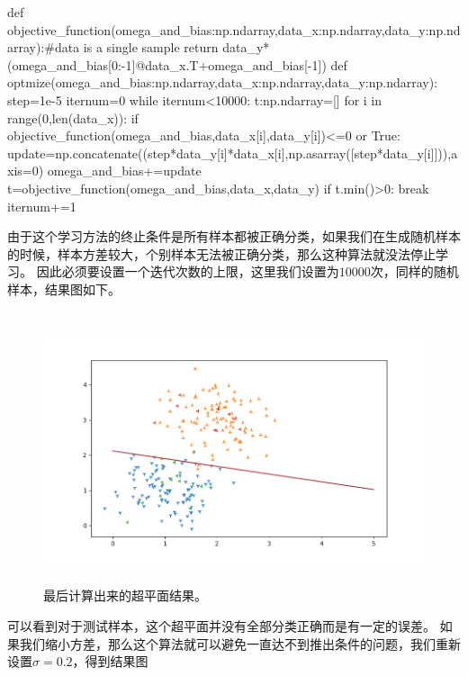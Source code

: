 \documentclass{article}
\begin{document}
 \begin{python}
def objective_function(omega_and_bias:np.ndarray,data_x:np.ndarray,data_y:np.ndarray):#data is a single sample
    return data_y*(omega_and_bias[0:-1]@data_x.T+omega_and_bias[-1])
def optmize(omega_and_bias:np.ndarray,data_x:np.ndarray,data_y:np.ndarray):
    step=1e-5
    iternum=0
    while iternum<10000:
        t:np.ndarray=[]
        for i in range(0,len(data_x)):
            if objective_function(omega_and_bias,data_x[i],data_y[i])<=0 or True:
                update=np.concatenate((step*data_y[i]*data_x[i],np.asarray([step*data_y[i]])),axis=0)
                omega_and_bias+=update
            t=objective_function(omega_and_bias,data_x,data_y)
        if t.min()>0:
            break
        iternum+=1

 \end{python}
由于这个学习方法的终止条件是所有样本都被正确分类，如果我们在生成随机样本的时候，样本方差较大，个别样本无法被正确分类，那么这种算法就没法停止学习。
因此必须要设置一个迭代次数的上限，这里我们设置为$10000$次，同样的随机样本，结果图如下。
\begin{figure}[H]
    \centering
    \begin{minipage}[t]{1.0\linewidth}
        \centering
        \includegraphics[height=8cm]{Figure_3.png}
        \caption{最后计算出来的超平面结果。}
    \end{minipage}
 \end{figure}
可以看到对于测试样本，这个超平面并没有全部分类正确而是有一定的误差。
如果我们缩小方差，那么这个算法就可以避免一直达不到推出条件的问题，我们重新设置$\sigma=0.2$，得到结果图
\end{document}
